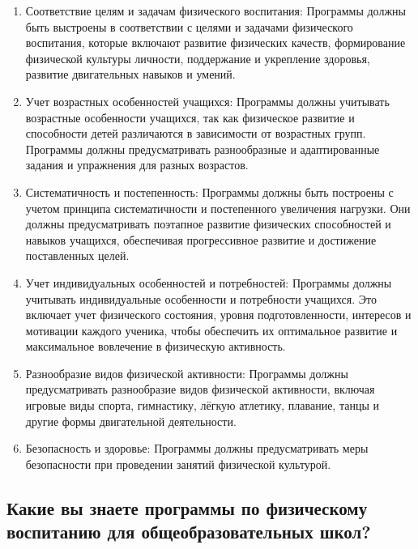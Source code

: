 \begin{enumerate}
    \item Соответствие целям и задачам физического воспитания: Программы должны быть выстроены в соответствии с целями и задачами физического воспитания, которые включают развитие физических качеств, формирование физической культуры личности, поддержание и укрепление здоровья, развитие двигательных навыков и умений.
    \item Учет возрастных особенностей учащихся: Программы должны учитывать возрастные особенности учащихся, так как физическое развитие и способности детей различаются в зависимости от возрастных групп. Программы должны предусматривать разнообразные и адаптированные задания и упражнения для разных возрастов.
    \item Систематичность и постепенность: Программы должны быть построены с учетом принципа систематичности и постепенного увеличения нагрузки. Они должны предусматривать поэтапное развитие физических способностей и навыков учащихся, обеспечивая прогрессивное развитие и достижение поставленных целей.
    \item Учет индивидуальных особенностей и потребностей: Программы должны учитывать индивидуальные особенности и потребности учащихся. Это включает учет физического состояния, уровня подготовленности, интересов и мотивации каждого ученика, чтобы обеспечить их оптимальное развитие и максимальное вовлечение в физическую активность.
    \item Разнообразие видов физической активности: Программы должны предусматривать разнообразие видов физической активности, включая игровые виды спорта, гимнастику, лёгкую атлетику, плавание, танцы и другие формы двигательной деятельности.
    \item Безопасность и здоровье: Программы должны предусматривать меры безопасности при проведении занятий физической культурой.
\end{enumerate}

\subsection{Какие вы знаете программы по физическому воспитанию для общеобразовательных школ?}

